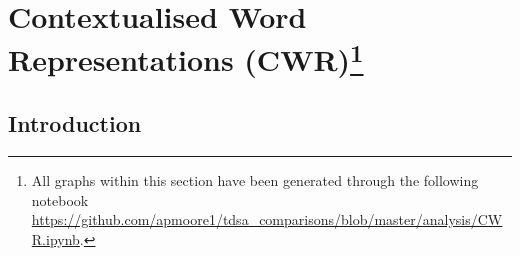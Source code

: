 \FloatBarrier
\section[Contextualised Word Representations (CWR)]{Contextualised Word Representations (CWR)\footnote{All graphs within this section have been generated through the following notebook \url{https://github.com/apmoore1/tdsa_comparisons/blob/master/analysis/CWR.ipynb}.}}
\label{section:aug_cwr}
\subsection{Introduction}
\label{section:aug_cwr_intro}

  
